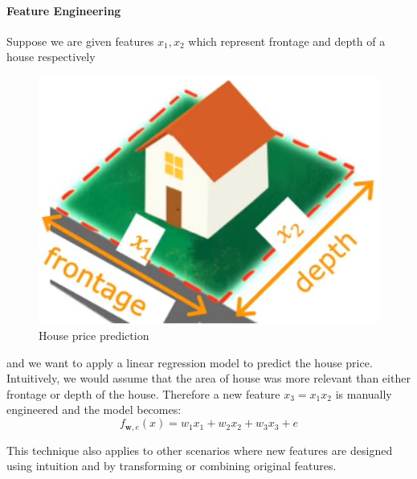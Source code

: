 \documentclass[12pt, twoside]{article}
\begin{document}
\begin{multicols*}{2}
			\paragraph{Feature Engineering} Suppose we are given features $x_1,x_2$ which represent frontage and depth of a house respectively
			\begin{figure}[H]
				\centering
				\includegraphics[width=\columnwidth]{feature-engineering}
				\caption{House price prediction}
			\end{figure}
			\noindent and we want to apply a linear regression model to predict the house price. Intuitively, we would assume that the area of house was more relevant than either frontage or depth of the house. Therefore a new feature $x_3=x_1x_2$ is manually engineered and the model becomes:
			$$ f_{\mathbf{w},e}(x)=w_1x_1+w_2x_2+w_3x_3+e $$
			
			This technique also applies to other scenarios where new features are designed using intuition and by transforming or combining original features.
			

\end{multicols*}
\end{document}
